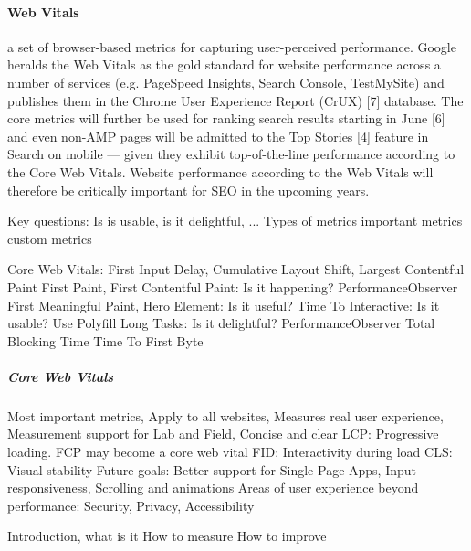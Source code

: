 \paragraph{Web Vitals}


a set of browser-based metrics for capturing user-perceived performance. Google heralds the Web Vitals as the gold standard for website performance across a number of services (e.g. PageSpeed Insights, Search Console, TestMySite) and publishes them in the Chrome User Experience Report (CrUX) [7] database. The core metrics will further be used for ranking search results starting in June [6] and even non-AMP pages will be admitted to the Top Stories [4] feature in Search on mobile — given they exhibit top-of-the-line performance according to the Core Web Vitals. Website performance according to the Web Vitals will therefore be critically important for SEO in the upcoming years.








 Key questions: Is is usable, is it delightful, ...
 Types of metrics
 important metrics
 custom metrics




 Core Web Vitals: First Input Delay, Cumulative Layout Shift, Largest Contentful Paint
 First Paint, First Contentful Paint: Is it happening? PerformanceObserver
 First Meaningful Paint, Hero Element: Is it useful? 
 Time To Interactive: Is it usable? Use Polyfill
 Long Tasks: Is it delightful? PerformanceObserver
 Total Blocking Time
 Time To First Byte



\subparagraph{Core Web Vitals}


 Most important metrics, Apply to all websites, Measures real user experience, Measurement support for Lab and Field, Concise and clear
 LCP: Progressive loading. FCP may become a core web vital
 FID: Interactivity during load
 CLS: Visual stability
 Future goals: Better support for Single Page Apps, Input responsiveness, Scrolling and animations
 Areas of user experience beyond performance: Security, Privacy, Accessibility



 Introduction, what is it
 How to measure
 How to improve


